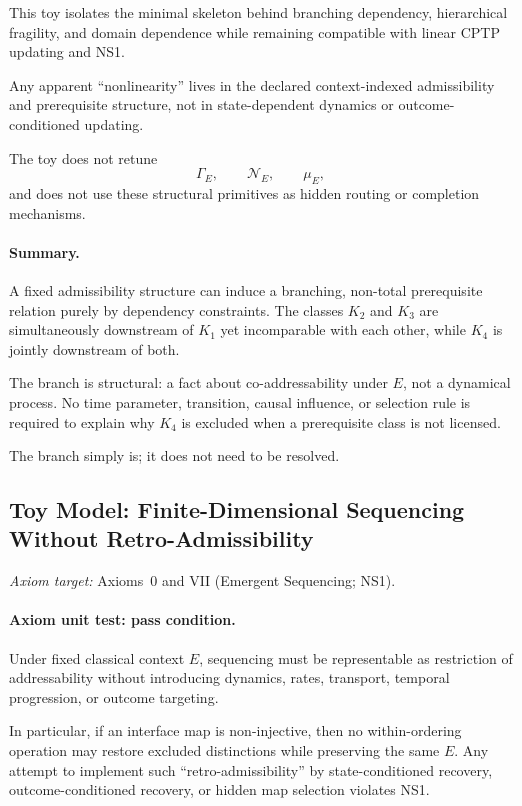 \documentclass[aps,prx,onecolumn,11pt]{revtex4-2}
\theoremstyle{plain}
\theoremstyle{definition}
\theoremstyle{remark}
\begin{document}
This toy isolates the minimal skeleton behind branching dependency,
hierarchical fragility, and domain dependence while remaining compatible
with linear CPTP updating and NS1.

Any apparent ``nonlinearity'' lives in the declared context-indexed
admissibility and prerequisite structure, not in state-dependent
dynamics or outcome-conditioned updating.

The toy does not retune
\[
\Gamma_E,
\qquad
\mathcal N_E,
\qquad
\mu_E,
\]
and does not use these structural primitives as hidden routing or
completion mechanisms.

\paragraph{Summary.}

A fixed admissibility structure can induce a branching, non-total
prerequisite relation purely by dependency constraints. The classes
\(K_2\) and \(K_3\) are simultaneously downstream of \(K_1\) yet
incomparable with each other, while \(K_4\) is jointly downstream of
both.

The branch is structural: a fact about co-addressability under \(E\),
not a dynamical process. No time parameter, transition, causal
influence, or selection rule is required to explain why \(K_4\) is
excluded when a prerequisite class is not licensed.

The branch simply is; it does not need to be resolved.

\subsection{Toy Model: Finite-Dimensional Sequencing Without Retro-Admissibility}
\label{toy:finite_dim_sequencing_no_retro}

\noindent\emph{Axiom target:} Axioms~0 and VII (Emergent Sequencing; NS1).

\paragraph{Axiom unit test: pass condition.}

Under fixed classical context \(E\), sequencing must be representable as
restriction of addressability without introducing dynamics, rates,
transport, temporal progression, or outcome targeting.

In particular, if an interface map is non-injective, then no
within-ordering operation may restore excluded distinctions while
preserving the same \(E\). Any attempt to implement such
``retro-admissibility'' by state-conditioned recovery,
outcome-conditioned recovery, or hidden map selection violates NS1.
\end{document}
